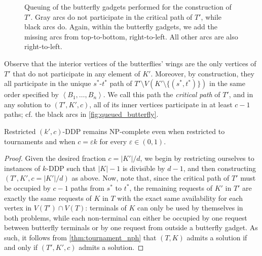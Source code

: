 \documentclass[a4paper,UKenglish,cleveref, autoref, thm-restate]{lipics-v2021}
\renewcommand{\NP}{{\sf NP}\xspace}
\newcommand{\angled}[1]{\left\langle{#1}\right\rangle}
\newcommand{\pname}[1]{{\sc #1}}
\newcommand{\congestion}{c}
\begin{document}
\begin{figure}[!htb]
    \caption{Queuing of the butterfly gadgets performed for the construction of $T'$. Gray
      arcs do not participate in the critical path of $T'$, while black arcs do. Again,
      within the butterfly gadgets, we add the missing arcs from top-to-bottom,
      right-to-left. All other arcs are also right-to-left.
    \label{fig:queued_butterfly}}
  \end{figure}

  Observe that the interior vertices of the butterflies' wings are the only vertices of
  $T'$ that do not participate in any element of $K'$.
  Moreover, by construction, they all participate in the unique $s^*$-$t^*$ path of $T'
  \setminus V(K' \setminus \{(s^*, t^*)\})$ in the same order specified by $\angled{B_1,
  \dots, B_n}$.
  We call this path the \textit{critical path} of $T'$, and in any solution to $(T', K',
  \congestion)$, all of its inner vertices participate in at least $\congestion-1$ paths;
  cf. the black arcs in \autoref{fig:queued_butterfly}.

  \begin{theorem}
    \label{thm:restricted_ddp_nph}
    \pname{Restricted $(k',c)$-DDP} remains \NP-complete even when
    restricted to tournaments and when $\congestion = \varepsilon k$ for every $\varepsilon \in (0,1)$. \end{theorem}

  \begin{proof}
    Given the desired fraction $\congestion = |K'|/d$, we begin by restricting ourselves
    to instances of
    \pname{$k$-DDP} such that $|K| - 1$ is divisible by $d - 1$, and then
    constructing $(T', K', \congestion = |K'|/d)$ as above.
    Now, note that, since the critical path of $T'$ must be occupied by $\congestion-1$ paths from
    $s^*$ to $t^*$, the remaining requests of $K'$ in $T'$ are exactly the same requests of
    $K$ in $T$ with the exact same availability for each vertex in $V(T') \cap V(T)$:
    terminals of $K$ can only be used by themselves in both problems, while each non-terminal
    can either be occupied by one request between butterfly terminals or by one request
    from outside a butterfly gadget.
    As such, it follows from \autoref{thm:tournament_nph} that $(T, K)$ admits a
    solution if and only if $(T', K', \congestion)$ admits a solution.
  \end{proof}
\end{document}

